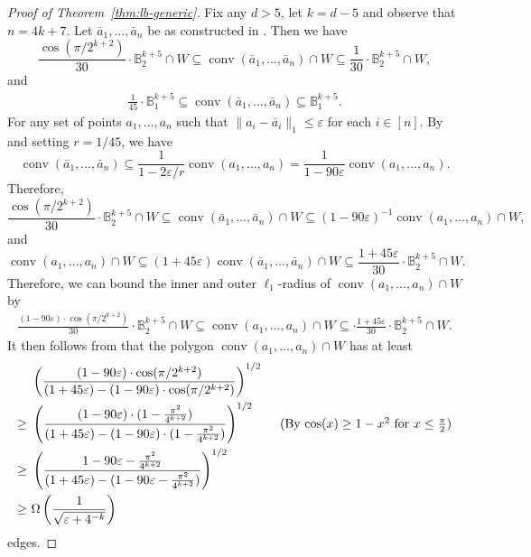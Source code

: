 \documentclass{theoretics}
\newcommand{\eps}{\varepsilon} %
\newcommand{\conv}{\operatorname{conv}}
\newcommand{\ball}{\mathbb{B}_2}
\renewcommand{\subset}{\subseteq}
\begin{document}
\begin{proof}[Proof of Theorem~\ref{thm:lb-generic}]
Fix any $d > 5$, let $k = d-5$ and observe that $n = 4k+7$. Let $\bar a_1,\ldots,\bar a_{n}$ be as constructed in . Then we have
\[
\frac{\cos(\pi/2^{k+2})}{30} \cdot \ball^{k+5} \cap W \subset \conv(\bar{a}_1, \ldots, \bar{a}_n) \cap W \subset \frac{1}{30}\cdot \ball^{k+5}\cap W ,
\]
and
\begin{align*}
    \frac{1}{45} \cdot \mathbb B_1^{k+5} \subset \conv(\bar{a}_1, \ldots, \bar{a}_n) \subset \mathbb B_1^{k+5} .
\end{align*}
For any set of points $a_1, \ldots, a_n$ such that $\|a_i - \bar{a}_i\|_1 \leq \eps$ for each $i \in [n]$. By  and setting $r = 1/45$, we have
\[
    \conv(\bar{a}_1, \ldots, \bar{a}_n) \subseteq \frac{1}{1 - 2\eps / r} \conv(a_1, \ldots, a_n) = \frac{1}{1 - 90 \eps} \conv(a_1,\ldots,a_n).
\]
Therefore,
\[
    \frac{\cos(\pi/2^{k+2})}{30} \cdot \ball^{k+5} \cap W \subset \conv(\bar a_1,\ldots,\bar a_n) \cap W \subset (1 - 90\eps)^{-1} \conv(a_1,\ldots,a_n)\cap W ,
\]
and 
\[
    \conv(a_1,\ldots,a_n) \cap W \subset (1+45\eps) \conv(\bar a_1,\ldots,\bar a_n) \cap W \subset \frac{1+45\eps }{30}\cdot \ball^{k+5}\cap W.
\]
Therefore, we can bound the inner and outer $\ell_1$-radius of $\conv(a_1, \ldots, a_n) \cap W$ by 
\begin{align*}
    \frac{(1 - 90\eps) \cdot \cos(\pi/2^{k+2})}{30} \cdot \ball^{k+5}\cap W \subseteq \conv(a_1, \ldots, a_n) \cap W \subseteq \cdot \frac{1+45\eps}{30} \cdot \ball^{k+5}\cap W .
\end{align*}
It then follows from  that the polygon $\conv(a_1,\ldots,a_n) \cap W$ has at least
\begin{align*}
    & \left( \frac{(1 - 90\eps) \cdot \cos(\pi/2^{k+2})}{(1+45\eps) - (1 - 90\eps) \cdot \cos(\pi/2^{k+2})} \right)^{1/2}  \\
    \geq ~ & \left( \frac{(1 - 90\eps) \cdot (1 - \frac{\pi^2}{4^{k+2}})}{(1+45\eps) - (1 - 90\eps) \cdot (1 - \frac{\pi^2}{4^{k+2}})} \right)^{1/2} \tag{By $\cos(x) \geq 1 - x^2$ for $x \leq \frac{\pi}{2}$} \\
    \geq ~ & \left( \frac{1 - 90\eps - \frac{\pi^2}{4^{k+2}}}{(1+45\eps) - (1 - 90\eps - \frac{\pi^2}{4^{k+2}})} \right)^{1/2}\\
    \geq ~ & \Omega \left(\frac{1}{\sqrt{\eps + 4^{-k}}} \right)
\end{align*}
edges.
\end{proof}
\end{document}
